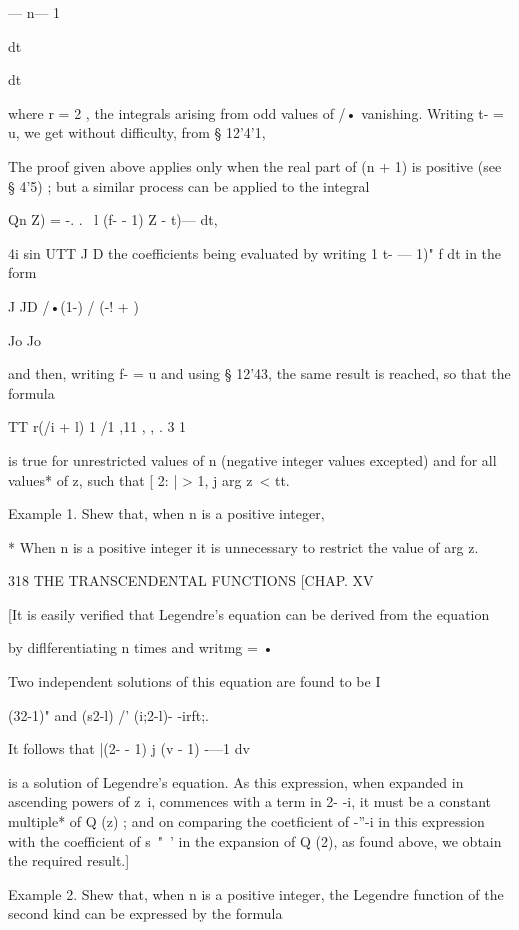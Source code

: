 {{— n— 1

dt






dt



where r = 2 , the integrals arising from odd values of /• vanishing.
Writing t- = u, we get without difficulty, from § 12'4'1,

The proof given above applies only when the real part of (n + 1) is
positive (see § 4'5) ; but a similar process can be applied to the
integral

Qn Z) = -. . \ l (f- - 1) Z - t)— dt,

4i sin UTT J D the coefficients being evaluated by writing 1 t- — 1)"
f dt in the form

J JD /•(1-) / (-! + )

Jo Jo

and then, writing f- = u and using § 12'43, the same result is
reached, so that the formula

TT r(/i + l) 1 /1 ,11 , , . 3 1

is true for unrestricted values of n (negative integer values
excepted) and for all values* of z, such that [ 2: | > 1, j arg z\ <
tt.

Example 1. Shew that, when n is a positive integer,

* When n is a positive integer it is unnecessary to restrict the value
of arg z.



318 THE TRANSCENDENTAL FUNCTIONS [CHAP. XV

[It is easily verified that Legendre's equation can be derived from
the equation

by diflferentiating n times and writmg = •

Two independent solutions of this equation are found to be I

(32-1)" and (s2-l) /' (i;2-l)- -irft;.

It follows that |(2- - 1) j (v - 1) -—1 dv

is a solution of Legendre's equation. As this expression, when
expanded in ascending powers of z~i, commences with a term in 2- -i,
it must be a constant multiple* of Q (z) ; and on comparing the
coetficient of -''-i in this expression with the coefficient of s~"~'
in the expansion of Q (2), as found above, we obtain the required
result.]

Example 2. Shew that, when n is a positive integer, the Legendre
function of the second kind can be expressed by the formula

}}
